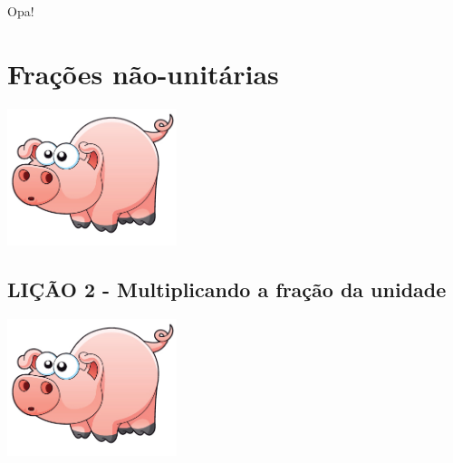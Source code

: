 \documentclass[a4,12pt]{book}
\begin{document}
\lipsum
\begin{refletindo}
 Opa!
 \lipsum[1]
\end{refletindo}

\lipsum[1]

\chapter{Frações não-unitárias}

\lipsum[2-4]

\includegraphics[width=\textwidth,height=4cm, keepaspectratio]{pig}





\section*{ LIÇÃO 2 - Multiplicando a fração da unidade }







\includegraphics[width=\textwidth,height=4cm, keepaspectratio]{pig}
\end{document}
